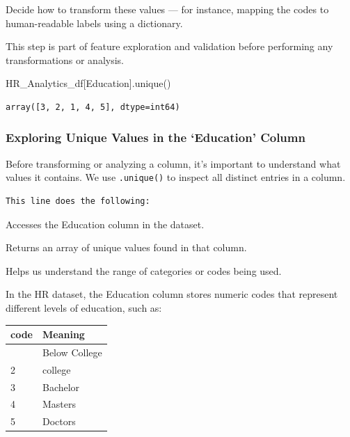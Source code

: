 \documentclass[
  letterpaper,
  DIV=11,
  numbers=noendperiod]{scrartcl}
\newenvironment{Shaded}{\begin{snugshade}}{\end{snugshade}}
\newcommand{\NormalTok}[1]{\textcolor[rgb]{0.00,0.23,0.31}{#1}}
\newcommand{\StringTok}[1]{\textcolor[rgb]{0.13,0.47,0.30}{#1}}
\begin{document}
Decide how to transform these values --- for instance, mapping the codes
to human-readable labels using a dictionary.

This step is part of feature exploration and validation before
performing any transformations or analysis.

\begin{Shaded}
\begin{Highlighting}[]
\NormalTok{HR\_Analytics\_df[}\StringTok{\textquotesingle{}Education\textquotesingle{}}\NormalTok{].unique()}
\end{Highlighting}
\end{Shaded}

\begin{verbatim}
array([3, 2, 1, 4, 5], dtype=int64)
\end{verbatim}

\subsubsection{Exploring Unique Values in the `Education'
Column}\label{exploring-unique-values-in-the-education-column}

Before transforming or analyzing a column, it's important to understand
what values it contains. We use \texttt{.unique()} to inspect all
distinct entries in a column.

\begin{verbatim}
This line does the following:
\end{verbatim}

Accesses the Education column in the dataset.

Returns an array of unique values found in that column.

Helps us understand the range of categories or codes being used.

In the HR dataset, the Education column stores numeric codes that
represent different levels of education, such as:

\begin{longtable}[]{@{}ll@{}}
\toprule\noalign{}
code & Meaning \\
\midrule\noalign{}
\endhead
\bottomrule\noalign{}
\endlastfoot
1 & Below College \\
2 & college \\
3 & Bachelor \\
4 & Masters \\
5 & Doctors \\
\end{longtable}
\end{document}
